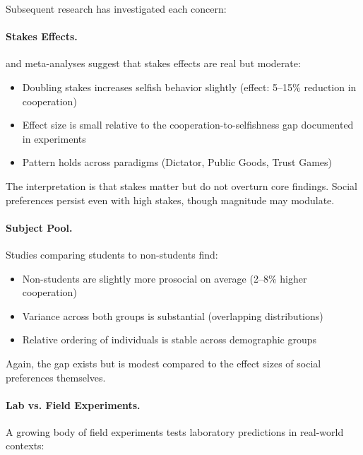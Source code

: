 \documentclass[12pt,oneside]{book}
\begin{document}
Subsequent research has investigated each concern:

\paragraph{Stakes Effects.}

\citet{levittlist2007} and meta-analyses suggest that stakes effects are real but moderate:
\begin{itemize}
  \item Doubling stakes increases selfish behavior slightly (effect: 5--15\% reduction in cooperation)
  \item Effect size is small relative to the cooperation-to-selfishness gap documented in experiments
  \item Pattern holds across paradigms (Dictator, Public Goods, Trust Games)
\end{itemize}

The interpretation is that stakes matter but do not overturn core findings. Social preferences
persist even with high stakes, though magnitude may modulate.

\paragraph{Subject Pool.}

Studies comparing students to non-students find:
\begin{itemize}
  \item Non-students are slightly more prosocial on average (2--8\% higher cooperation)
  \item Variance across both groups is substantial (overlapping distributions)
  \item Relative ordering of individuals is stable across demographic groups
\end{itemize}

Again, the gap exists but is modest compared to the effect sizes of social preferences themselves.

\paragraph{Lab vs. Field Experiments.}

A growing body of field experiments tests laboratory predictions in real-world contexts:
\end{document}
